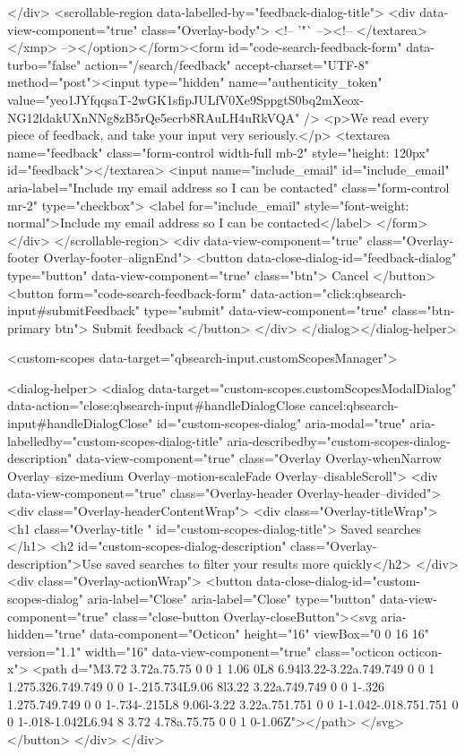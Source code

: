 </div>
      <scrollable-region data-labelled-by="feedback-dialog-title">
        <div data-view-component="true" class="Overlay-body">        <!-- '"` --><!-- </textarea></xmp> --></option></form><form id="code-search-feedback-form" data-turbo="false" action="/search/feedback" accept-charset="UTF-8" method="post"><input type="hidden" name="authenticity_token" value="yeo1JYfqqsaT-2wGK1sfipJULfV0Xe9SppgtS0bq2mXeox-NG12ldakUXnNNg8zB5rQe5ecrb8RAuLH4uRkVQA" />
          <p>We read every piece of feedback, and take your input very seriously.</p>
          <textarea name="feedback" class="form-control width-full mb-2" style="height: 120px" id="feedback"></textarea>
          <input name="include_email" id="include_email" aria-label="Include my email address so I can be contacted" class="form-control mr-2" type="checkbox">
          <label for="include_email" style="font-weight: normal">Include my email address so I can be contacted</label>
</form></div>
      </scrollable-region>
      <div data-view-component="true" class="Overlay-footer Overlay-footer--alignEnd">          <button data-close-dialog-id="feedback-dialog" type="button" data-view-component="true" class="btn">    Cancel
</button>
          <button form="code-search-feedback-form" data-action="click:qbsearch-input#submitFeedback" type="submit" data-view-component="true" class="btn-primary btn">    Submit feedback
</button>
</div>
</dialog></dialog-helper>

    <custom-scopes data-target="qbsearch-input.customScopesManager">
    
<dialog-helper>
  <dialog data-target="custom-scopes.customScopesModalDialog" data-action="close:qbsearch-input#handleDialogClose cancel:qbsearch-input#handleDialogClose" id="custom-scopes-dialog" aria-modal="true" aria-labelledby="custom-scopes-dialog-title" aria-describedby="custom-scopes-dialog-description" data-view-component="true" class="Overlay Overlay-whenNarrow Overlay--size-medium Overlay--motion-scaleFade Overlay--disableScroll">
    <div data-view-component="true" class="Overlay-header Overlay-header--divided">
  <div class="Overlay-headerContentWrap">
    <div class="Overlay-titleWrap">
      <h1 class="Overlay-title " id="custom-scopes-dialog-title">
        Saved searches
      </h1>
        <h2 id="custom-scopes-dialog-description" class="Overlay-description">Use saved searches to filter your results more quickly</h2>
    </div>
    <div class="Overlay-actionWrap">
      <button data-close-dialog-id="custom-scopes-dialog" aria-label="Close" aria-label="Close" type="button" data-view-component="true" class="close-button Overlay-closeButton"><svg aria-hidden="true" data-component="Octicon" height="16" viewBox="0 0 16 16" version="1.1" width="16" data-view-component="true" class="octicon octicon-x">
    <path d="M3.72 3.72a.75.75 0 0 1 1.06 0L8 6.94l3.22-3.22a.749.749 0 0 1 1.275.326.749.749 0 0 1-.215.734L9.06 8l3.22 3.22a.749.749 0 0 1-.326 1.275.749.749 0 0 1-.734-.215L8 9.06l-3.22 3.22a.751.751 0 0 1-1.042-.018.751.751 0 0 1-.018-1.042L6.94 8 3.72 4.78a.75.75 0 0 1 0-1.06Z"></path>
</svg></button>
    </div>
  </div>
  
